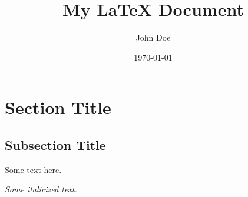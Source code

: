 \documentclass{article}%
\title{My LaTeX Document}%
\author{John Doe}%
\date{\today}%
\begin{document}
%
\normalsize%
\maketitle%
\section{Section Title}%
\label{sec:SectionTitle}%
\subsection{Subsection Title}%
\label{subsec:SubsectionTitle}%
Some text here.

%
\textit{Some italicized text.}

%
%
\end{document}
